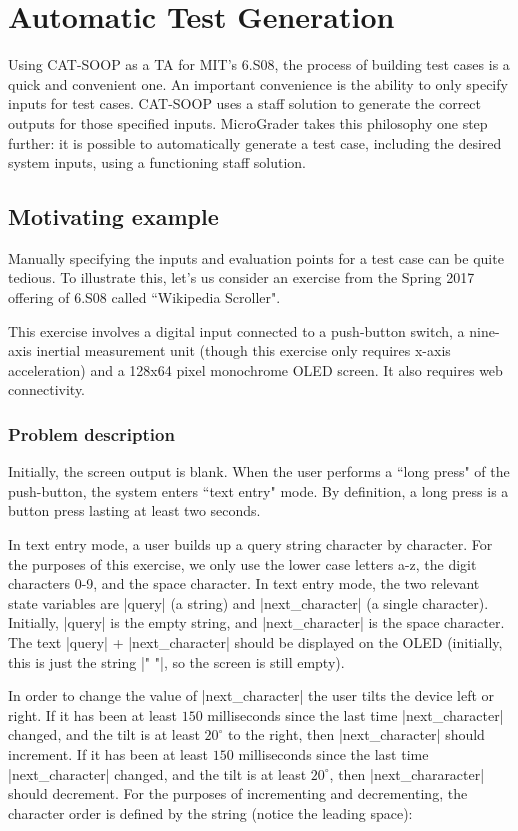 \documentclass[12pt]{article}
\begin{document}
\newpage
\section{Automatic Test Generation}
\label{sec:scaffold}

Using CAT-SOOP as a TA for MIT's 6.S08, the process of building test cases is a quick and convenient one.  An important convenience is the ability to only specify inputs for test cases.  CAT-SOOP uses a staff solution to generate the correct outputs for those specified inputs.  MicroGrader takes this philosophy one step further: it is possible to automatically generate a test case, including the desired system inputs, using a functioning staff solution.

\subsection{Motivating example}
Manually specifying the inputs and evaluation points for a test case can be quite tedious.  To illustrate this, let's us consider an exercise from the Spring 2017 offering of 6.S08 called ``Wikipedia Scroller".

This exercise involves a digital input connected to a push-button switch, a nine-axis inertial measurement unit (though this exercise only requires x-axis acceleration) and a 128x64 pixel monochrome OLED screen.  It also requires web connectivity.

\subsubsection{Problem description}

Initially, the screen output is blank.  When the user performs a ``long press" of the push-button, the system enters ``text entry" mode.  By definition, a long press is a button press lasting at least two seconds.

In text entry mode, a user builds up a query string character by character.  For the purposes of this exercise, we only use the lower case letters a-z, the digit characters 0-9, and the space character.  In text entry mode, the two relevant state variables are |query| (a string) and |next_character| (a single character).  Initially, |query| is the empty string, and |next_character| is the space character.  The text |query| + |next_character| should be displayed on the OLED (initially, this is just the string |" "|, so the screen is still empty).

In order to change the value of |next_character| the user tilts the device left or right.  If it has been at least $150$ milliseconds since the last time |next_character| changed, and the tilt is at least $20^{\circ}$ to the right, then |next_character| should increment.  If it has been at least $150$ milliseconds since the last time |next_character| changed, and the tilt is at least $20^{\circ}$, then |next_chararacter| should decrement.  For the purposes of incrementing and decrementing, the character order is defined by the string (notice the leading space):
\end{document}
